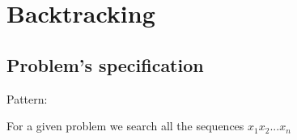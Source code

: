 \chapter{Backtracking}
\section{Problem's specification}

Pattern:

For a given problem we search all the sequences  $x_{1}x_{2} ... x_{n}$

